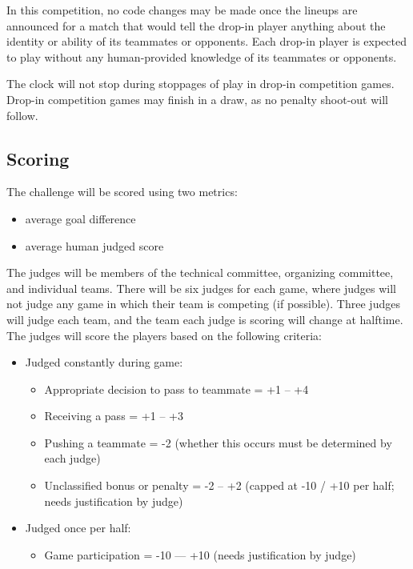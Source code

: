\documentclass[12pt]{article}
\begin{document}
In this competition, no code changes may be made once the lineups are announced for a match that would tell the drop-in player anything about the identity or ability of its teammates or opponents.  Each drop-in player is expected to play without any human-provided knowledge of its teammates or opponents. 

The clock will not stop during stoppages of play in drop-in competition games.  Drop-in competition games may finish in a draw, as no penalty shoot-out will follow.

\subsection{Scoring}
\label{sec:drop-in:scoring}
The challenge will be scored using two metrics: 
\begin{itemize}
\item average goal difference 
\item average human judged score 
\end{itemize}

The judges will be members of the technical committee, organizing committee, and individual teams.  There will be six judges for each game, where judges will not judge any game in which their team is competing (if possible).  Three judges will judge each team, and the team each judge is scoring will change at halftime.  The judges will score the players based on the following criteria:
\begin{itemize}
\item Judged constantly during game:
  \begin{itemize}
  \item Appropriate decision to pass to teammate = +1 -- +4
  \item Receiving a pass = +1 -- +3
  \item Pushing a teammate = -2 (whether this occurs must be determined by each judge)
  \item Unclassified bonus or penalty = -2 -- +2 (capped at -10 / +10 per half; needs justification by judge)
  \end{itemize}
\item Judged once per half:
  \begin{itemize}
  \item Game participation = -10 --- +10 (needs justification by judge)
  \end{itemize}

\end{itemize}
\end{document}
